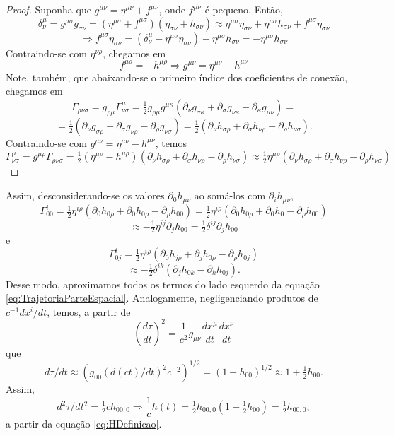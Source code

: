 \begin{proof}
	Suponha que $ g^{\mu \nu}=\eta^{\mu \nu}+f^{\mu \nu} $, onde $ f^{\mu\nu} $ é pequeno. Então,
	 \[\delta_{\nu}^{\mu}=g^{\mu \sigma} g_{\sigma \nu}=\left(\eta^{\mu \sigma}+f^{\mu \sigma}\right)\left(\eta_{\sigma \nu}+h_{\sigma \nu}\right) \approx
	 \eta^{\mu\sigma}\eta_{\sigma\nu}+\eta^{\mu\sigma}h_{\sigma\nu}+f^{\mu\sigma}\eta_{\sigma \nu} \]
	 \[
	 \Rightarrow f^{\mu\sigma}\eta_{\sigma \nu}= (\delta_{\nu}^{\mu} - \eta^{\mu\sigma}\eta_{\sigma\nu})-\eta^{\mu\sigma}h_{\sigma\nu} = -\eta^{\mu\sigma}h_{\sigma\nu}
	 \]
	 Contraindo-se com $ \eta^{\nu \rho} $, chegamos em 
	 \[f^{\mu\rho}=-h^{\mu\rho} \Rightarrow g^{\mu \nu}=\eta^{\mu \nu}-h^{\mu \nu} \]
	 Note, também, que abaixando-se o primeiro índice dos coeficientes de conexão, chegamos em 
	 \[ \Gamma_{\rho \nu \sigma}=g_{\rho\mu}\Gamma_{\nu \sigma}^\mu=
	 \tfrac{1}{2}g_{\rho\mu}g^{\mu\kappa}(\partial_{\nu}g_{\sigma\kappa}+\partial_{\sigma}g_{\nu\kappa}-\partial_{\kappa}g_{\mu\nu})=
	 \]
	 \[
	 =\tfrac{1}{2}\left(\partial_{\nu} g_{\sigma \rho}+\partial_{\sigma} g_{\nu \rho}-\partial_{\rho} g_{\nu \sigma}\right)=
	 \tfrac{1}{2}\left(\partial_{\nu} h_{\sigma \rho}+\partial_{\sigma} h_{\nu \rho}-\partial_{\rho} h_{\nu \sigma}\right).
	\]
	  Contraindo-se com $  g^{\mu \nu}=\eta^{\mu \nu}-h^{\mu \nu} $, temos 
	 \[
	 \Gamma^{\mu}_{\nu\sigma}=
	 g^{\mu\rho}\Gamma_{\rho\nu\sigma}= \tfrac{1}{2}(\eta^{\mu\rho}-h^{\mu\rho})(\partial_{\nu} h_{\sigma \rho}+\partial_{\sigma} h_{\nu \rho}-\partial_{\rho} h_{\nu \sigma})
	 \approx \tfrac{1}{2} \eta^{\mu \rho}\left(\partial_{\nu} h_{\sigma \rho}+\partial_{\sigma} h_{\nu \rho}-\partial_{\rho} h_{\nu \sigma}\right)
	 \]	 
\end{proof}

Assim, desconsiderando-se os valores $ \partial_{0} h_{\mu \nu} $ ao somá-los com $ \partial_{i} h_{\mu \nu} $,
\[
\Gamma_{00}^{i}=\tfrac{1}{2} \eta^{i \rho}\left(\partial_{0} h_{0 \rho}+\partial_{0} h_{0 \rho}-\partial_{\rho} h_{00}\right) = 
\tfrac{1}{2} \eta^{i \rho}\left(\partial_{0} h_{0 \rho}+\partial_{0} h_{0 }-\partial_{\rho} h_{00}\right)
\]
\[
\approx -\tfrac{1}{2} \eta^{i j} \partial_{j} h_{00}=\tfrac{1}{2} \delta^{i j} \partial_{j} h_{00}
\]
e
\[
\Gamma_{0 j}^{i}=\tfrac{1}{2} \eta^{i \rho}\left(\partial_{0} h_{j \rho}+\partial_{j} h_{0 \rho}-\partial_{\rho} h_{0 j}\right)
\]
\[
\approx -\tfrac{1}{2} \delta^{i k}\left(\partial_{j} h_{0 k}-\partial_{k} h_{0 j}\right) .
\]
Desse modo, aproximamos todos os termos do lado esquerdo da equação \eqref{eq:TrajetoriaParteEspacial}. Analogamente, negligenciando produtos de $ c^{-1} d x^{i} / d t $, temos, a partir de
\[
\left(\frac{d \tau}{d t}\right)^{2}=\frac{1}{c^{2}} g_{\mu \nu} \frac{d x^{\mu}}{d t} \frac{d x^{\nu}}{d t}
\]
que
\[
d \tau / d t\approx \left(g_{00}\left({d(ct)}/dt\right)^2c^{-2}\right)^{1/2} = \left(1+h_{00}\right)^{1 / 2}\approx 1+\tfrac{1}{2} h_{00} .
\]
Assim,
\[
d^{2} \tau / d t^{2}=\tfrac{1}{2} c h_{00,0} \Rightarrow \frac{1}{c} h(t)=\tfrac{1}{2} h_{00,0}\left(1-\tfrac{1}{2} h_{00}\right)=\tfrac{1}{2} h_{00,0},
\]
a partir da equação \eqref{eq:HDefinicao}. 

